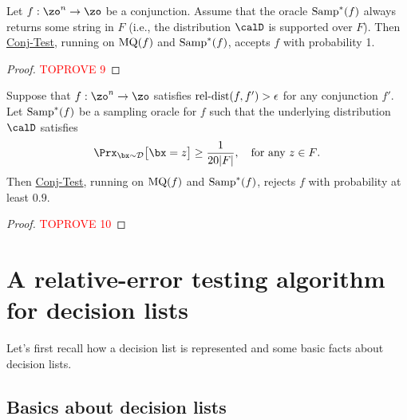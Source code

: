 \documentclass[11pt]{article}
\theoremstyle{definition}
\begin{document}
\begin{theorem}\label{thm: accept weaker assumption}
    Let $f: \zo^n \to \zo$ be a conjunction.
Assume that the oracle $\mathrm{Samp}^\ast(f)$ always returns some string in $F$ (i.e., the  distribution $\calD$ is supported over $F$).
Then \hyperlink{Algorithm2}{\sc Conj-Test}, running on $\mathrm{MQ}(f)$ and $\mathrm{Samp}^*(f)$,
accepts $f$ with probability 1.
\end{theorem}
\begin{proof}\textcolor{red}{TOPROVE 9}\end{proof}



\begin{theorem}\label{thm: reject weaker assumption}
    Suppose that $f: \zo^n \to \zo$ satisfies $\mathrm{rel}\text{-}\mathrm{dist}(f,f') > \epsilon$ for any conjunction $f'$. Let $\mathrm{Samp}^\ast(f)$ be a sampling oracle for $f$ such that the underlying distribution 
    $\calD$ satisfies
\[\Prx_{\bx \sim {\cal D}}\big[\bx = z\big] \geq \frac{1}{20|F|},\quad\text{for any $z\in F$}.\]
Then \hyperlink{Algorithm2}{\sc Conj-Test}, running on $\mathrm{MQ}(f)$ and $\mathrm{Samp}^*(f)$,
rejects $f$ with probability at least $0.9$.
\end{theorem}
\begin{proof}\textcolor{red}{TOPROVE 10}\end{proof}

    








 

\section{A relative-error testing algorithm for decision lists} \label{sec:DL}



Let's first recall how   
 a decision list is represented and some basic facts about decision lists.

\subsection{Basics about decision lists} \label{sec:basics-DL}
\end{document}
